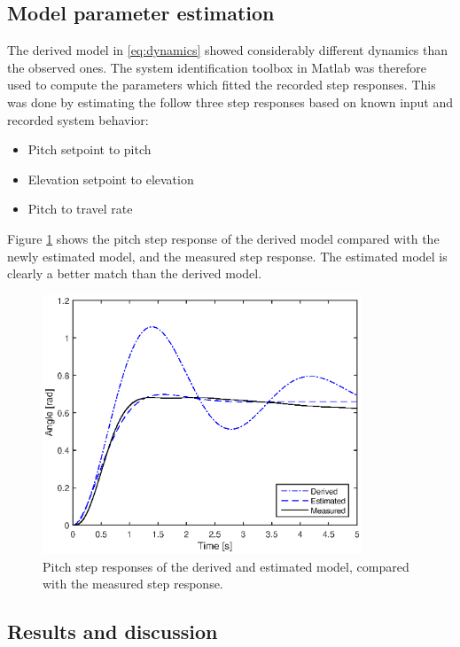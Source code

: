 \subsection{Model parameter estimation}
The derived model in \eqref{eq:dynamics} showed considerably different dynamics than the observed ones. The system identification toolbox in Matlab was therefore used to compute the parameters which fitted the recorded step responses. This was done by estimating the follow three step responses based on known input and recorded system behavior:

\begin{itemize}
	\item{Pitch setpoint to pitch}
	\item{Elevation setpoint to elevation}
	\item{Pitch to travel rate}
\end{itemize}

Figure \ref{fig:pitch_model_comparison} shows the pitch step response of the derived model compared with the newly estimated model, and the measured step response. The estimated model is clearly a better match than the derived model.

\begin{figure}[hp]
	\centering
		\includegraphics[width=0.85\textwidth]{figures/1/pitch_model_comparison.eps}
	\caption{Pitch step responses of the derived and estimated model, compared with the measured step response.}
	\label{fig:pitch_model_comparison}
\end{figure}


\subsection{Results and discussion}
\label{subsection:part1_results}


